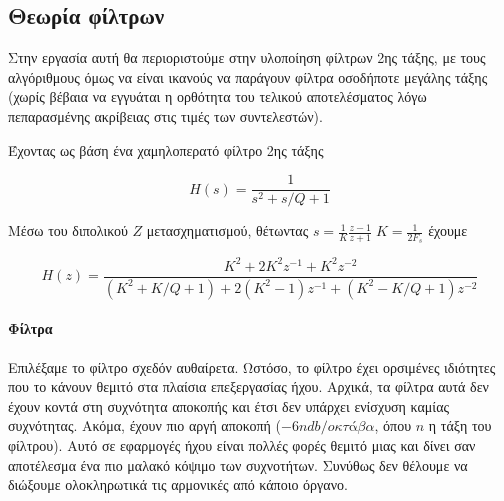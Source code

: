 \documentclass[12pt]{extarticle}
\begin{document}
\subsection{Θεωρία  φίλτρων}

Στην εργασία αυτή θα περιοριστούμε στην υλοποίηση φίλτρων 2ης τάξης, με τους 
αλγόριθμους όμως να είναι ικανούς να παράγουν φίλτρα οσοδήποτε μεγάλης τάξης (χωρίς 
βέβαια να εγγυάται η ορθότητα του τελικού αποτελέσματος λόγω πεπαρασμένης ακρίβειας 
στις τιμές των συντελεστών). 

Έχοντας ως βάση ένα χαμηλοπερατό φίλτρο 2ης τάξης \cite{OpenheimAlan}

\begin{equation}
    H(s) = \frac{1}{s^2 + s/Q + 1} 
    \label{eq:h_lowpassfilter}
\end{equation}

Μέσω του διπολικού $Z$ μετασχηματισμού, θέτωντας $s = \frac{1}{K}\frac{z-1}{z+1} \; K = \frac{1}{2F_s}$ έχουμε \cite{BilinearZTransformWeb}

\begin{equation}
    H(z) = \frac{K^2 + 2K^2 z^{-1} + K^2 z^{-2}}{(K^2 + K/Q + 1) + 2(K^2 - 1) z^{-1} + (K^2 - K/Q + 1) z^{-2}}
    \label{eq:h_z_final}
\end{equation}


\paragraph{Φίλτρα } 

Επιλέξαμε το φίλτρο  σχεδόν αυθαίρετα. Ωστόσο, το φίλτρο 
έχει ορσιμένες ιδιότητες που το κάνουν θεμιτό στα πλαίσια επεξεργασίας ήχου.
Αρχικά, τα φίλτρα αυτά δεν έχουν  κοντά στη συχνότητα αποκοπής 
και έτσι δεν υπάρχει ενίσχυση καμίας συχνότητας. Ακόμα, 
έχουν πιο αργή αποκοπή ($-6n db/οκτάβα$, όπου $n$ η τάξη του φίλτρου). 
Αυτό σε εφαρμογές ήχου είναι πολλές φορές θεμιτό μιας και δίνει σαν αποτέλεσμα ένα πιο μαλακό 
κόψιμο των συχνοτήτων. Συνύθως δεν θέλουμε να διώξουμε ολοκληρωτικά τις αρμονικές 
από κάποιο όργανο.
\end{document}
